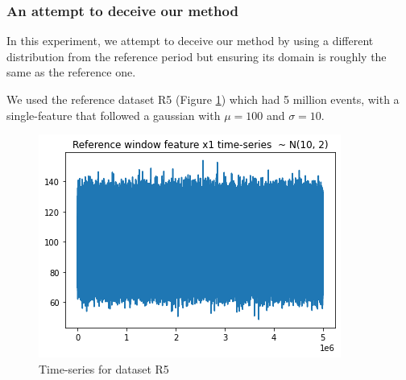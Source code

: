 \subsubsection{An attempt to deceive our method}
In this experiment, we attempt to deceive our method by using a different distribution from the reference period but ensuring its domain is roughly the same as the reference one.

We used the reference dataset R5 (Figure \ref{fig:timeseries-r5}) which had 5 million events, with a single-feature that followed a gaussian with  $\mu=100$ and $\sigma=10$.
\begin{figure}[!htb]
    \begin{center}
      \includegraphics[scale=0.6]{figures/timeseries-r5.png}
      \caption[]{Time-series for dataset R5}
      \label{fig:timeseries-r5}
    \end{center}
\end{figure}

